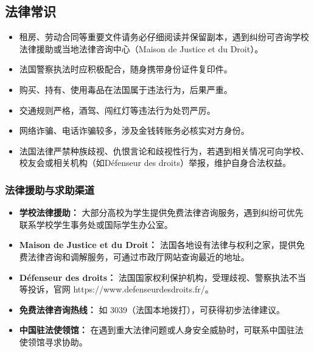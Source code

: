 \subsection{法律常识}

\begin{itemize}
    \item 租房、劳动合同等重要文件请务必仔细阅读并保留副本，遇到纠纷可咨询学校法律援助或当地法律咨询中心（Maison de Justice et du Droit）。
    \item 法国警察执法时应积极配合，随身携带身份证件复印件。
    \item 购买、持有、使用毒品在法国属于违法行为，后果严重。
    \item 交通规则严格，酒驾、闯红灯等违法行为处罚严厉。
    \item 网络诈骗、电话诈骗较多，涉及金钱转账务必核实对方身份。
    \item 法国法律严禁种族歧视、仇恨言论和歧视性行为，若遇到相关情况可向学校、校友会或相关机构（如Défenseur des droits）举报，维护自身合法权益。
\end{itemize}

\subsubsection{法律援助与求助渠道}
\begin{itemize}
    \item \textbf{学校法律援助：} 大部分高校为学生提供免费法律咨询服务，遇到纠纷可优先联系学校学生事务处或国际学生办公室。
    \item \textbf{Maison de Justice et du Droit：} 法国各地设有法律与权利之家，提供免费法律咨询和调解服务，可通过市政厅网站查询最近的地址。
    \item \textbf{Défenseur des droits：} 法国国家权利保护机构，受理歧视、警察执法不当等投诉，官网 https://www.defenseurdesdroits.fr/。
    \item \textbf{免费法律咨询热线：} 如 3039（法国本地拨打），可获得初步法律建议。
    \item \textbf{中国驻法使领馆：} 在遇到重大法律问题或人身安全威胁时，可联系中国驻法使领馆寻求协助。
\end{itemize}

